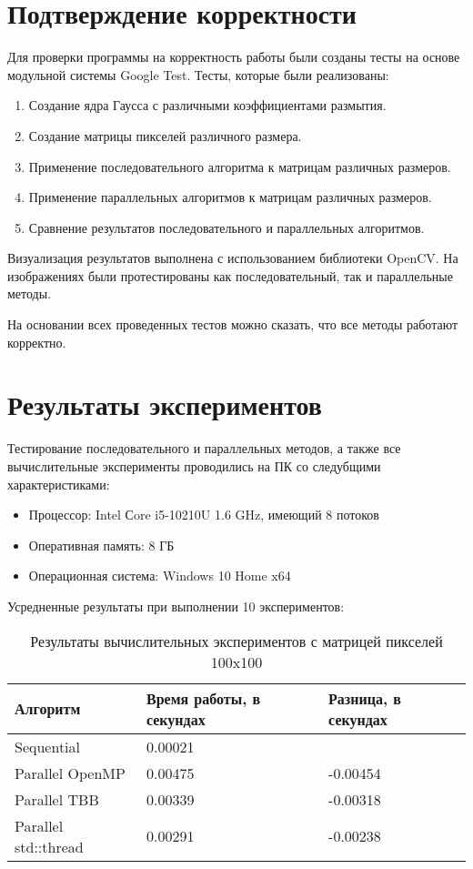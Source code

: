 \documentclass{report}
\begin{document}
\section*{Подтверждение корректности}
\par Для проверки программы на корректность работы были созданы тесты на основе модульной системы Google Test. Тесты, которые были реализованы:
\begin{enumerate}
\item Создание ядра Гаусса с различными коэффициентами размытия.
\item Создание матрицы пикселей различного размера.
\item Применение последовательного алгоритма к матрицам различных размеров.
\item Применение параллельных алгоритмов к матрицам различных размеров.
\item Сравнение результатов последовательного и параллельных алгоритмов.
\end{enumerate}
\par Визуализация результатов выполнена с использованием библиотеки OpenCV. На изображениях были протестированы как последовательный, так и параллельные методы.
\par На основании всех проведенных тестов можно сказать, что все методы работают корректно.
\newpage

\section*{Результаты экспериментов}
Тестирование последовательного и параллельных методов, а также все вычислительные эксперименты проводились на ПК со следубщими характеристиками:
\begin{itemize}
\item Процессор: Intel Сore i5-10210U 1.6 GHz, имеющий 8 потоков
\item Оперативная память: 8 ГБ
\item Операционная система: Windows 10 Home x64
\end{itemize}

\par Усредненные результаты при выполнении 10 экспериментов:

\begin{table}[!ht]
\centering
\begin{tabular}{| p{5cm} | p{5cm} | p{5cm} |}
\hline
Алгоритм & Время работы, в секундах & Разница, в секундах  \\[5pt]
\hline
Sequential              & 0.00021       &  \\
Parallel OpenMP         & 0.00475       & -0.00454 \\
Parallel TBB            & 0.00339       & -0.00318 \\
Parallel std::thread    & 0.00291       & -0.00238 \\
\hline
\end{tabular}
\caption{Результаты вычислительных экспериментов с матрицей пикселей 100x100}
\end{table}
\end{document}

